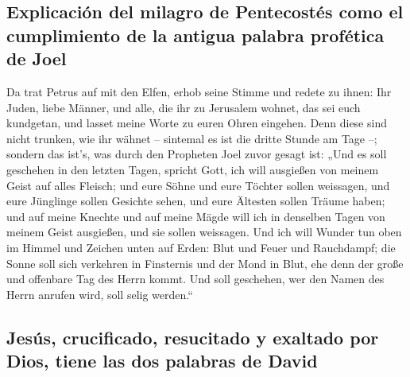 \hypertarget{explicaciuxf3n-del-milagro-de-pentecostuxe9s-como-el-cumplimiento-de-la-antigua-palabra-profuxe9tica-de-joel}{%
\subsection{Explicación del milagro de Pentecostés como el cumplimiento
de la antigua palabra profética de
Joel}\label{explicaciuxf3n-del-milagro-de-pentecostuxe9s-como-el-cumplimiento-de-la-antigua-palabra-profuxe9tica-de-joel}}

 Da trat Petrus auf mit den Elfen, erhob seine Stimme und
redete zu ihnen: Ihr Juden, liebe Männer, und alle, die ihr zu Jerusalem
wohnet, das sei euch kundgetan, und lasset meine Worte zu euren Ohren
eingehen.  Denn diese sind nicht trunken, wie ihr wähnet
-- sintemal es ist die dritte Stunde am Tage --;  sondern
das ist's, was durch den Propheten Joel zuvor gesagt ist:
 „Und es soll geschehen in den letzten Tagen, spricht
Gott, ich will ausgießen von meinem Geist auf alles Fleisch; und eure
Söhne und eure Töchter sollen weissagen, und eure Jünglinge sollen
Gesichte sehen, und eure Ältesten sollen Träume haben; 
und auf meine Knechte und auf meine Mägde will ich in denselben Tagen
von meinem Geist ausgießen, und sie sollen weissagen. 
Und ich will Wunder tun oben im Himmel und Zeichen unten auf Erden: Blut
und Feuer und Rauchdampf;  die Sonne soll sich verkehren
in Finsternis und der Mond in Blut, ehe denn der große und offenbare Tag
des Herrn kommt.  Und soll geschehen, wer den Namen des
Herrn anrufen wird, soll selig werden.``

\hypertarget{jesuxfas-crucificado-resucitado-y-exaltado-por-dios-tiene-las-dos-palabras-de-david}{%
\subsection{Jesús, crucificado, resucitado y exaltado por Dios, tiene
las dos palabras de
David}\label{jesuxfas-crucificado-resucitado-y-exaltado-por-dios-tiene-las-dos-palabras-de-david}}

